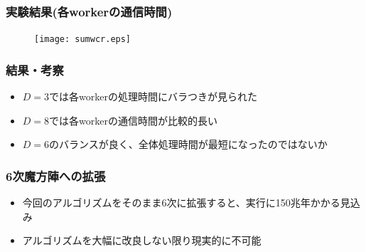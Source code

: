 \documentclass[dvipdfmx,20pt,notheorems,t]{beamer}
\begin{document}
\begin{frame}\frametitle{実験結果(各workerの通信時間)}
\begin{figure}[htb]
\centering
\texttt{[image: sumwcr.eps]}
\end{figure}
\end{frame}

\begin{frame}\frametitle{結果・考察}
\begin{itemize}
\item $D=3$では各workerの処理時間にバラつきが見られた
\item $D=8$では各workerの通信時間が比較的長い
\item $D=6$のバランスが良く、全体処理時間が最短になったのではないか
\end{itemize}
\end{frame}

\begin{frame}\frametitle{6次魔方陣への拡張}
\begin{itemize}
\item 今回のアルゴリズムをそのまま6次に拡張すると、実行に150兆年かかる見込み
\item アルゴリズムを大幅に改良しない限り現実的に不可能
\end{itemize}
\end{frame}
\end{document}
